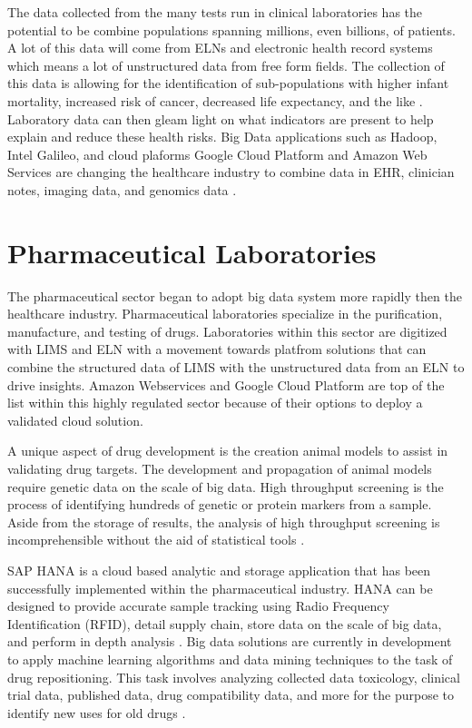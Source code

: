 \documentclass[sigconf]{acmart}
\begin{document}
The data collected from the many tests run in clinical laboratories has the potential to be combine populations spanning millions, even billions, of patients. A lot of this data will come from ELNs and electronic health record systems which means a lot of unstructured data from free form fields. The collection of this data is allowing for the identification of sub-populations with higher infant mortality, increased risk of cancer, decreased life expectancy, and the like \cite{Panda}. Laboratory data can then gleam light on what indicators are present to help explain and reduce these health risks. Big Data applications such as Hadoop, Intel Galileo, and cloud plaforms Google Cloud Platform and Amazon Web Services are changing the healthcare industry to combine data in EHR, clinician notes, imaging data, and genomics data \cite{Dineshkumar}.

\section{Pharmaceutical Laboratories}
The pharmaceutical sector began to adopt big data system more rapidly then the healthcare industry. Pharmaceutical laboratories specialize in the purification, manufacture, and testing of drugs. Laboratories within this sector are digitized with LIMS and ELN with a movement towards platfrom solutions that can combine the structured data of LIMS with the unstructured data from an ELN to drive insights. Amazon Webservices and Google Cloud Platform are top of the list within this highly regulated sector because of their options to deploy a validated cloud solution. 

A unique aspect of drug development is the creation animal models to assist in validating drug targets. The development and propagation of animal models require genetic data on the scale of big data. High throughput screening is the process of identifying hundreds of genetic or protein markers from a sample. Aside from the storage of results, the analysis of high throughput screening is incomprehensible without the aid of statistical tools \cite{Seebode}.

SAP HANA is a cloud based analytic and storage application that has been successfully implemented within the pharmaceutical industry. HANA can be designed to provide accurate sample tracking using Radio Frequency Identification (RFID), detail supply chain, store data on the scale of big data, and perform in depth analysis \cite{Chircu}. Big data solutions are currently in development to apply machine learning algorithms and data mining techniques to the task of drug repositioning. This task involves analyzing collected data toxicology, clinical trial data, published data, drug compatibility data, and more for the purpose to identify new uses for old drugs \cite{Zhang}.
\end{document}
